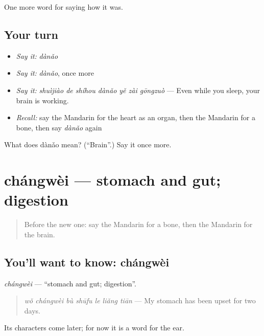 \begin{grammarlens}[title={What you've built}]
One more word for saying how it was.
\end{grammarlens}

\subsection*{Your turn}
\begin{itemize}
\raggedright
  \item \emph{Say it:} \emph{dànǎo}
  \item \emph{Say it:} \emph{dànǎo}, once more
  \item \emph{Say it:} \emph{shuìjiào de shíhou dànǎo yě zài gōngzuò} — Even while you sleep, your brain is working.
  \item \emph{Recall:} say the Mandarin for the heart as an organ, then the Mandarin for a bone, then say \emph{dànǎo} again
\end{itemize}

\begin{tcolorbox}[breakable,colback=teal!4,colframe=teal!35!black,title={Before you move on}]
What does dànǎo mean? (\textquotedblleft{}Brain\textquotedblright{}.) Say it once more.
\end{tcolorbox}
\section[chángwèi]{chángwèi — stomach and gut; digestion}

\label{lesson:ZH-C477-changwei}



\begin{quote}
Before the new one: say the Mandarin for a bone, then the Mandarin for the brain.
\end{quote}

\subsection*{You'll want to know: chángwèi}
\emph{chángwèi} — \textquotedblleft{}stomach and gut; digestion\textquotedblright{}.

\begin{quote}
\emph{wǒ chángwèi bù shūfu le liǎng tiān} — My stomach has been upset for two days.
\end{quote}

Its characters come later; for now it is a word for the ear.

